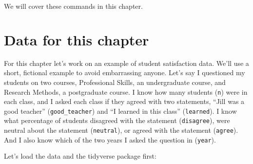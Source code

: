 \documentclass[
]{book}
\begin{document}
We will cover these commands in this chapter.

\hypertarget{data-for-this-chapter}{%
\section{Data for this chapter}\label{data-for-this-chapter}}

For this chapter let's work on an example of student satisfaction data. We'll use a short, fictional example to avoid embarrassing anyone. Let's say I questioned my students on two courses, Professional Skills, an undergraduate course, and Research Methods, a postgraduate course. I know how many students (\texttt{n}) were in each class, and I asked each class if they agreed with two statements, ``Jill was a good teacher'' (\texttt{good\_teacher}) and ``I learned in this class'' (\texttt{learned}). I know what percentage of students disagreed with the statement (\texttt{disagree}), were neutral about the statement (\texttt{neutral}), or agreed with the statement (\texttt{agree}). And I also know which of the two years I asked the question in (\texttt{year}).

Let's load the data and the tidyverse package first:
\end{document}
